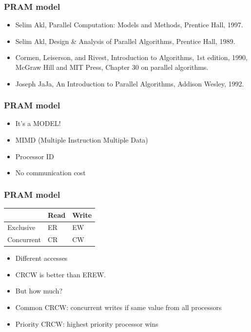 \documentclass[12pt,aspectratio=169]{beamer}
\begin{document}
\begin{frame}\frametitle{PRAM model}
  \begin{itemize}[<.->]
    \item
Selim Akl, Parallel Computation: Models and Methods, Prentice Hall, 1997.    
    \item
Selim Akl, Design \& Analysis of Parallel Algorithms, Prentice Hall, 1989.
    \item
Cormen, Leiserson, and Rivest, Introduction to Algorithms, 1st edition,
1990, McGraw Hill and MIT Press, Chapter 30 on parallel algorithms.
    \item
Joseph JaJa, An Introduction to Parallel Algorithms, Addison Wesley, 1992.
\end{itemize}
\end{frame}

\begin{frame}\frametitle{PRAM model}
  \begin{itemize}
  \item
    It's a \alert{MODEL}!
  \item
    MIMD (Multiple Instruction Multiple Data)
  \item
    Processor ID
  \item
    No communication cost
  \end{itemize}
\end{frame}

\begin{frame}\frametitle{PRAM model}
\begin{center}
  \begin{tabular}{|l|l|l|}
\hline
 & Read & Write \\
\hline
Exclusive & ER & EW \\
\hline
Concurrent & CR & CW \\
\hline
\end{tabular}

\begin{itemize}
\item
  Different accesses
  \item
    CRCW is better than EREW.
  \item
    But how much?
  \item
    Common CRCW: concurrent writes if same value from all processors
  \item
    Priority CRCW: highest priority processor wins
  \end{itemize}
\end{center}
\end{frame}
\end{document}

